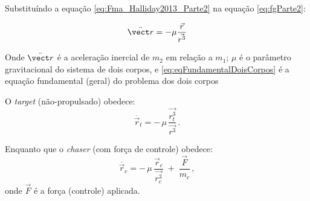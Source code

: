 Substituíndo a equação \eqref{eq:Fma_Halliday2013_Parte2} na equação \eqref{eq:fgParte2}:

\begin{equation}
\label{eq:eqFundamentalDoisCorpos}
\ddot {\vect r} = -\mu \frac{\vec r}{\vec {r^3}}
\end{equation}

Onde $\ddot{\vect r}$ é a aceleração inercial de $m_2$ em relação a $m_1$; $\mu$ é o parâmetro gravitacional do sistema de dois corpos, e \eqref{eq:eqFundamentalDoisCorpos} é a equação fundamental (geral) do problema dos dois corpos \cite{fehse2003,wie2008space}





O \emph{target} (não-propulsado) obedece:
\begin{equation}
\label{eq:movimentoTarget}
\ddot{\vec r_t} = -\,\mu\,\frac{\vec {r_t^3}}{\vec {r^3}}\,.
\end{equation}

Enquanto que o \emph{chaser} (com força de controle) obedece:
\begin{equation}
\label{eq:movimentoChaser}
\ddot{\vec r_c} = -\,\mu\,\frac{\vec r_c}{\vec {r_c^3}} \;+\; \frac{\vec F}{m_c}\,,
\end{equation}
onde \(\vec F\) é a força (controle) aplicada.
